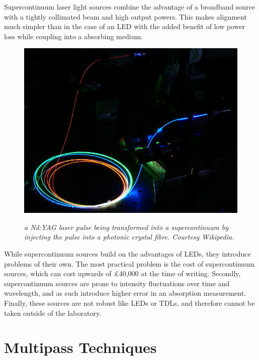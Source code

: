 Supercontinuum laser light sources combine the advantage of a broadband source
with a tightly collimated beam and high output powers. This makes alignment
much simpler than in the case of an \ac{LED} with the added benefit of low
power loss while coupling into a absorbing medium.


\begin{figure}
\begin{center}
  \includegraphics[width=\marginspace]{figures/supercontinuum.png}
\end{center}
\emph{\footnotesize{a Nd:YAG laser pulse being transformed into a supercontinuum by injecting the pulse into a photonic crystal fibre. Courtesy Wikipedia.}}
\end{figure}

While supercontinuum sources build on the advantages of \acp{LED}, they
introduce problems of their own. The most practical problem is the cost of
supercontinuum sources, which can cost upwards of \pounds40,000 at the time of
writing. Secondly, supercontinuum sources are prone to intensity fluctuations
over time and wavelength, and as such introduce higher error in an absorption
measurement.  Finally, these sources are not robust like \acp{LED} or
\acp{TDL}, and therefore cannot be taken outside of the laboratory.



\section{Multipass Techniques}\label{sec:multipass}

